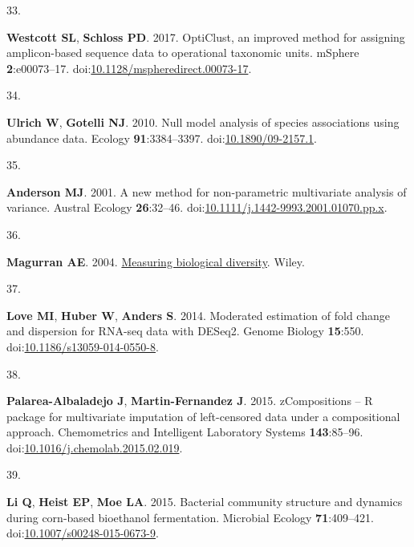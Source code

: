 \documentclass[
]{article}
\newlength{\cslhangindent}
\newlength{\csllabelwidth}
\newlength{\cslentryspacingunit} %
\newenvironment{CSLReferences}[2] %
 {%
  \setlength{\parindent}{0pt}
  \ifodd #1
  \let\oldpar\par
  \def\par{\hangindent=\cslhangindent\oldpar}
  \fi
  \setlength{\parskip}{#2\cslentryspacingunit}
 }%
 {}
\newcommand{\CSLLeftMargin}[1]{\parbox[t]{\csllabelwidth}{#1}}
\newcommand{\CSLRightInline}[1]{\parbox[t]{\linewidth - \csllabelwidth}{#1}\break}
\begin{document}
\begin{CSLReferences}{0}{1}
\leavevmode{}%
\CSLLeftMargin{33. }%
\CSLRightInline{\textbf{Westcott SL}, \textbf{Schloss PD}. 2017.
{OptiClust}, an improved method for assigning amplicon-based sequence
data to operational taxonomic units. {mSphere} \textbf{2}:e00073--17.
doi:\href{https://doi.org/10.1128/mspheredirect.00073-17}{10.1128/mspheredirect.00073-17}.}

\leavevmode{}%
\CSLLeftMargin{34. }%
\CSLRightInline{\textbf{Ulrich W}, \textbf{Gotelli NJ}. 2010. Null model
analysis of species associations using abundance data. Ecology
\textbf{91}:3384--3397.
doi:\href{https://doi.org/10.1890/09-2157.1}{10.1890/09-2157.1}.}

\leavevmode{}%
\CSLLeftMargin{35. }%
\CSLRightInline{\textbf{Anderson MJ}. 2001. A new method for
non-parametric multivariate analysis of variance. Austral Ecology
\textbf{26}:32--46.
doi:\href{https://doi.org/10.1111/j.1442-9993.2001.01070.pp.x}{10.1111/j.1442-9993.2001.01070.pp.x}.}

\leavevmode{}%
\CSLLeftMargin{36. }%
\CSLRightInline{\textbf{Magurran AE}. 2004.
\href{https://books.google.com/books?id=tUqzLSUzXxcC}{Measuring
biological diversity}. Wiley.}

\leavevmode{}%
\CSLLeftMargin{37. }%
\CSLRightInline{\textbf{Love MI}, \textbf{Huber W}, \textbf{Anders S}.
2014. Moderated estimation of fold change and dispersion for {RNA}-seq
data with {DESeq}2. Genome Biology \textbf{15}:550.
doi:\href{https://doi.org/10.1186/s13059-014-0550-8}{10.1186/s13059-014-0550-8}.}

\leavevmode{}%
\CSLLeftMargin{38. }%
\CSLRightInline{\textbf{Palarea-Albaladejo J}, \textbf{Martin-Fernandez
J}. 2015. zCompositions -- {R} package for multivariate imputation of
left-censored data under a compositional approach. Chemometrics and
Intelligent Laboratory Systems \textbf{143}:85--96.
doi:\href{https://doi.org/10.1016/j.chemolab.2015.02.019}{10.1016/j.chemolab.2015.02.019}.}

\leavevmode{}%
\CSLLeftMargin{39. }%
\CSLRightInline{\textbf{Li Q}, \textbf{Heist EP}, \textbf{Moe LA}. 2015.
Bacterial community structure and dynamics during corn-based bioethanol
fermentation. Microbial Ecology \textbf{71}:409--421.
doi:\href{https://doi.org/10.1007/s00248-015-0673-9}{10.1007/s00248-015-0673-9}.}


\end{CSLReferences}
\end{document}
